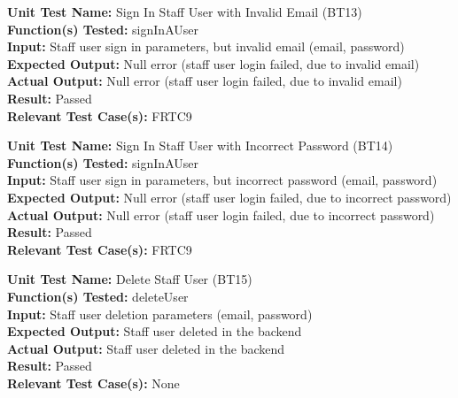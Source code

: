 \documentclass[12pt, titlepage]{article}
\begin{document}
\begin{mdframed}[linewidth=0.5mm]
  \textbf{Unit Test Name:} Sign In Staff User with Invalid Email (BT13) \\
  \textbf{Function(s) Tested:} signInAUser \\
  \textbf{Input:} Staff user sign in parameters, but invalid email (email, password) \\
  \textbf{Expected Output:} Null error (staff user login failed, due to invalid email) \\
  \textbf{Actual Output:} Null error (staff user login failed, due to invalid email) \\
  \textbf{Result:} Passed \\
  \textbf{Relevant Test Case(s):} FRTC9
\end{mdframed}

\begin{mdframed}[linewidth=0.5mm]
  \textbf{Unit Test Name:} Sign In Staff User with Incorrect Password (BT14) \\
  \textbf{Function(s) Tested:} signInAUser \\
  \textbf{Input:} Staff user sign in parameters, but incorrect password (email, password) \\
  \textbf{Expected Output:} Null error (staff user login failed, due to incorrect password) \\
  \textbf{Actual Output:} Null error (staff user login failed, due to incorrect password) \\
  \textbf{Result:} Passed \\
  \textbf{Relevant Test Case(s):} FRTC9
\end{mdframed}

\begin{mdframed}[linewidth=0.5mm]
  \textbf{Unit Test Name:} Delete Staff User (BT15) \\
  \textbf{Function(s) Tested:} deleteUser \\
  \textbf{Input:} Staff user deletion parameters (email, password) \\
  \textbf{Expected Output:} Staff user deleted in the backend \\
  \textbf{Actual Output:} Staff user deleted in the backend \\
  \textbf{Result:} Passed \\
  \textbf{Relevant Test Case(s):} None
\end{mdframed}
\end{document}
